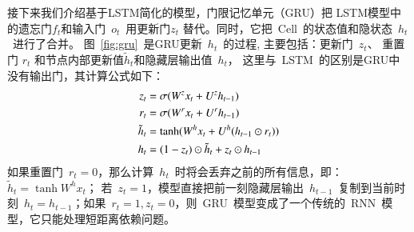 接下来我们介绍基于LSTM简化的模型，门限记忆单元（GRU）把 LSTM模型中的遗忘门$f_t$和输入门~$o_t$~用更新门$z_t$ 替代。同时，它把~Cell~的状态值和隐状态~$h_t$~进行了合并。 图~\ref{fig:gru}~是GRU更新~$h_t$~的过程, 主要包括：更新门~$z_t$、 重置门 $r_t$ 和节点内部更新值$\tilde h_t$和隐藏层输出值~$h_t$， 这里与~LSTM~的区别是GRU中没有输出门，其计算公式如下：
\begin{equation}\label{equ:gru}
\setlength{\abovedisplayskip}{10pt}
\setlength{\belowdisplayskip}{10pt}
\begin{split}
   z_t &= \sigma ( W^z x_t+ U^z h_{t-1}) \\
   r_t &= \sigma(W^r x_t  + U^r h_{t-1}  )\\
   \tilde h_t  &= \tanh (W^h x_t  + U^h(h_{t-1} \odot r_t) ) \\
   h_t &= (1-z_t)\odot \tilde h_t  + z_t \odot h_{t-1}
\end{split}
\end{equation}
如果重置门~$r_t=0$，那么计算~$h_t$~时将会丢弃之前的所有信息，即：$\tilde h_t=\tanh W^h x_t$； 若~$z_t=1$，模型直接把前一刻隐藏层输出~$h_{t-1}$~复制到当前时刻~$h_t=h_{t-1}$；如果~$r_t=1,z_t=0$，则~GRU~模型变成了一个传统的~RNN~模型，它只能处理短距离依赖问题。


